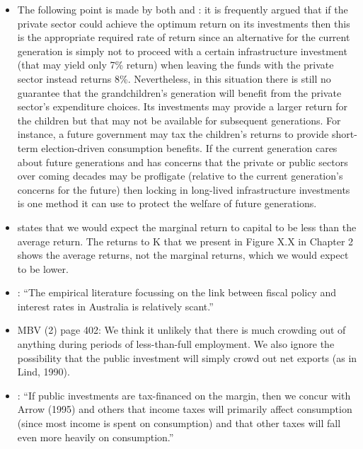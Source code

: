 \begin{itemize}
    \item The following point is made by both \textcite[29]{Grimes-Beyond-Simple-CBA} and \textcite[142]{Arrow-et-al-1995-IPCC-note-on-discounting}: it is frequently argued that if the private sector could achieve the optimum return on its investments then this is the appropriate required rate of return since an alternative for the current generation is simply not to proceed with a certain infrastructure investment (that may yield only 7\% return) when leaving the funds with the private sector instead returns 8\%. Nevertheless, in this situation there is still no guarantee that the grandchildren’s generation will benefit from the private sector’s expenditure choices. Its investments may provide a larger return for the children but that may not be available for subsequent generations. For instance, a future government may tax the children’s returns to provide short-term election-driven consumption benefits. If the current generation cares about future generations and has concerns that the private or public sectors over coming decades may be profligate (relative to the current generation’s concerns for the future) then locking in long-lived infrastructure investments is one method it can use to protect the welfare of future generations. 
    
    \item \textcite[142]{Arrow-et-al-1995-IPCC-note-on-discounting} states that we would expect the marginal return to capital to be less than the average return. The returns to K that we present in Figure X.X in Chapter 2 shows the average returns, not the marginal returns, which we would expect to be lower. 
    
    \item \textcite{treasury2010link-between-fiscal-policy-and-interest-rates}: ``The empirical literature focussing on the link between fiscal policy and interest rates in Australia is relatively scant.''
    
    \item MBV (2) page 402: We think it unlikely that there is much crowding out of anything during periods of less-than-full employment. We also ignore the possibility that the public investment will simply crowd out net exports (as in Lind, 1990).
    
    \item \textcite[404]{Moore-Boardman-Vining-2013b-The-choice-of-discount-rate}: ``If public investments are tax-financed on the margin, then we concur with Arrow (1995) and others that income taxes will primarily affect consumption (since most income is spent on consumption) and that other taxes will fall even more heavily on consumption.''

\end{itemize}




